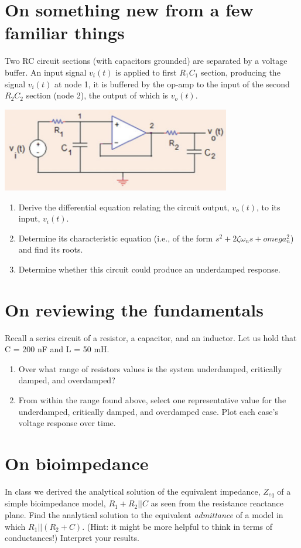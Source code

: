 \documentclass[11pt]{book}
\begin{document}
\section{On something new from a few familiar things}
Two RC circuit sections (with capacitors grounded) are separated by a voltage buffer. An input signal $v_i(t)$ is applied to first $R_1C_1$ section, producing the signal $v_i(t)$ at node 1, it is buffered by the op-amp to the input of the second $R_2C_2$ section (node 2), the output of which is $v_o(t)$.
\begin{center}
	\includegraphics[width=0.75\textwidth]{figures/hw5.01.png}
\end{center}
\begin{enumerate}
	\item Derive the differential equation relating the circuit output, $v_o(t)$, to its input, $v_i(t)$.
	\item Determine its characteristic equation (i.e., of the form $s^2 + 2\zeta \omega_n s + omega_n^2$) and find its roots.
	\item Determine whether this circuit could produce an underdamped response.
\end{enumerate}

\newpage

\section{On reviewing the fundamentals}
Recall a series circuit of a resistor, a capacitor, and an inductor. Let us hold that C = 200 nF and L = 50 mH.
\begin{enumerate}
	\item Over what range of resistors values is the system underdamped, critically damped, and overdamped?
	\item From within the range found above, select one representative value for the underdamped, critically damped, and overdamped case. Plot each case’s voltage response over time.
\end{enumerate}

\section{On bioimpedance}
In class we derived the analytical solution of the equivalent impedance, $Z_{eq}$ of a simple bioimpedance model, $R_1 + R_2\vert\vert C$ as seen from the resistance reactance plane. Find the analytical solution to the equivalent \textit{admittance} of a model in which $R_1\vert\vert(R_2 + C)$. (Hint: it might be more helpful to think in terms of conductances!) Interpret your results.
\end{document}
